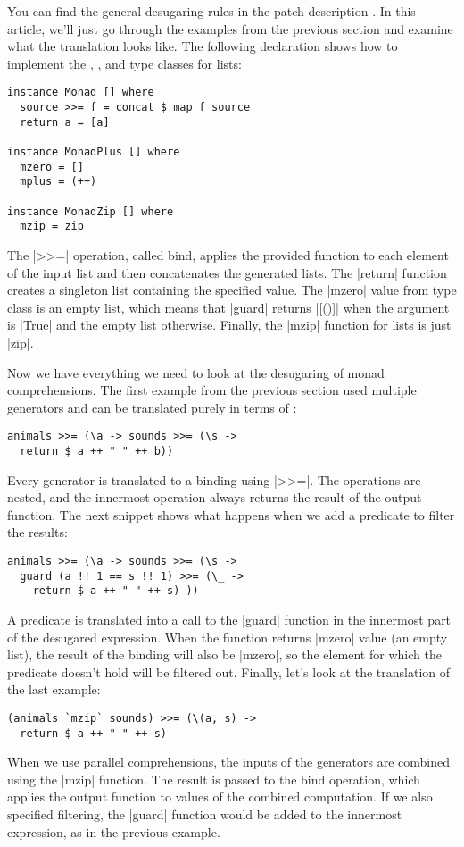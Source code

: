 \documentclass{tmr}
\begin{document}
You can find the general desugaring rules in the patch description \cite{bringbackmc}. In this 
article, we'll just go through the examples from the previous section
and examine what the 
translation looks like. The following declaration shows how to
implement the , , and  type classes
for lists:
\begin{verbatim}
instance Monad [] where
  source >>= f = concat $ map f source
  return a = [a]

instance MonadPlus [] where
  mzero = []
  mplus = (++)

instance MonadZip [] where
  mzip = zip
\end{verbatim}
The |>>=| operation, called bind, applies the provided function to each element of the input list 
and then concatenates the generated lists. The |return| function creates a singleton list containing 
the specified value. The |mzero| value from  type class is an empty list, which 
means that |guard| returns |[()]| when the argument is |True| and the empty list otherwise. Finally,
the |mzip| function for lists is just |zip|.

Now we have everything we need to look at the desugaring of monad comprehensions. The first
example from the previous section used multiple generators and can be translated purely in terms
of :

\begin{verbatim}
animals >>= (\a -> sounds >>= (\s -> 
  return $ a ++ " " ++ b))
\end{verbatim}
Every generator is translated to a binding using |>>=|. The operations are nested, and
the innermost operation always returns the result of the output function. The next snippet shows
what happens when we add a predicate to filter the results:

\begin{verbatim}
animals >>= (\a -> sounds >>= (\s -> 
  guard (a !! 1 == s !! 1) >>= (\_ -> 
    return $ a ++ " " ++ s) ))
\end{verbatim}
A predicate is translated into a call to the |guard| function in the innermost part of the 
desugared expression. When the function returns |mzero| value (an empty list), the result of the
binding will also be |mzero|, so the element for which the predicate doesn't hold will be 
filtered out. Finally, let's look at the translation of the last example:

\begin{verbatim}
(animals `mzip` sounds) >>= (\(a, s) -> 
  return $ a ++ " " ++ s)
\end{verbatim}
When we use parallel comprehensions, the inputs of the generators are combined using the |mzip|
function. The result is passed to the bind operation, which applies the output function to values
of the combined computation. If we also specified filtering, the |guard| function would be added 
to the innermost expression, as in the previous example.
\end{document}
